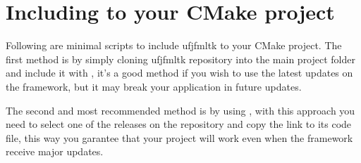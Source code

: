 \documentclass[letterpaper,10pt,english]{sphinxmanual}
\begin{document}
\section{Including to your CMake project}
\label{\detokenize{getting_started/installation:including-to-your-cmake-project}}
\sphinxAtStartPar
Following are minimal scripts to include ufjfmltk to your CMake project. The first method is by simply cloning
ufjfmltk repository into the main project folder and include it with , it’s a good method if
you wish to use the latest updates on the framework, but it may break your application in future updates.

\begin{sphinxVerbatim}[commandchars=\\\{\}]
 

 

 
\end{sphinxVerbatim}

\sphinxAtStartPar
The second and most recommended method is by using , with this approach you need to select one of the releases on the repository
and copy the link to its code  file, this way you garantee that your project will work even when the framework receive major updates.

\begin{sphinxVerbatim}[commandchars=\\\{\}]
 
 

         

 
 
\end{sphinxVerbatim}
\end{document}
